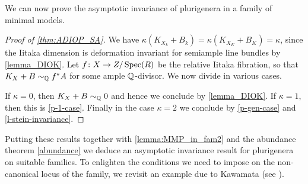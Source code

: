 	
	We can now prove the asymptotic invariance of plurigenera in a family of minimal models.
	
	\begin{proof}[Proof of \autoref{thm:ADIOP_SA}]
		We have $\kappa(K_{X_k}+B_k)=\kappa(K_{X_K}+B_K)=\kappa$, since the Iitaka dimension is deformation invariant for semiample line bundles by \autoref{lemma_DIOK}. Let $f \colon X\to Z/\operatorname{Spec} (R)$ be the relative Iitaka fibration, so that $K_X+B\sim_{\mathbb{Q}}f^\ast A$ for some ample $\mathbb{Q}$-divisor. 
		We now divide in various cases.
		
		If $\kappa=0$, then $K_X+B\sim_{\mathbb{Q}}0$ and hence we conclude by \autoref{lemma_DIOK}.
		If $\kappa=1$, then this is \autoref{p-1-case}. 
		Finally in the case $\kappa=2$ we conclude by \autoref{p-gen-case} and \autoref{l-stein-invariance}. 	
	\end{proof}
	
	
	Putting these results together with \autoref{lemma:MMP_in_fam2} and the abundance theorem \autoref{abundance} we deduce an asymptotic invariance result for plurigenera on suitable families. To enlighten the conditions we need to impose on the non-canonical locus of the family, we revisit an example due to Kawamata (see \cite[Example 4.3]{Kaw99}).
	
